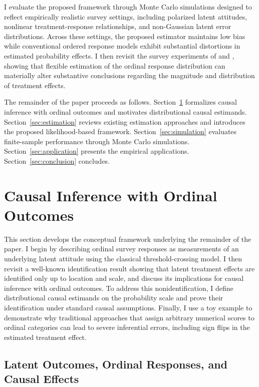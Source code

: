 \documentclass{article}
\begin{document}
I evaluate the proposed framework through Monte Carlo simulations designed to reflect empirically realistic survey settings, including polarized latent attitudes, nonlinear treatment-response relationships, and non-Gaussian latent error distributions. Across these settings, the proposed estimator maintains low bias while conventional ordered response models exhibit substantial distortions in estimated probability effects. I then revisit the survey experiments of \citet{Tomz2020a} and \citet{Mattingly2025a}, showing that flexible estimation of the ordinal response distribution can materially alter substantive conclusions regarding the magnitude and distribution of treatment effects.

The remainder of the paper proceeds as follows. Section~\ref{sec:causalordinal} formalizes causal inference with ordinal outcomes and motivates distributional causal estimands. Section~\ref{sec:estimation} reviews existing estimation approaches and introduces the proposed likelihood-based framework. Section~\ref{sec:simulation} evaluates finite-sample performance through Monte Carlo simulations. Section~\ref{sec:application} presents the empirical applications. Section~\ref{sec:conclusion} concludes.

\clearpage



\section{Causal Inference with Ordinal Outcomes}
\label{sec:causalordinal}

This section develops the conceptual framework underlying the remainder of the paper. I begin by describing ordinal survey responses as measurements of an underlying latent attitude using the classical threshold-crossing model. I then revisit a well-known identification result showing that latent treatment effects are identified only up to location and scale, and discuss its implications for causal inference with ordinal outcomes. To address this nonidentification, I define distributional causal estimands on the probability scale and prove their identification under standard causal assumptions. Finally, I use a toy example to demonstrate why traditional approaches that assign arbitrary numerical scores to ordinal categories can lead to severe inferential errors, including sign flips in the estimated treatment effect.

\subsection{Latent Outcomes, Ordinal Responses, and Causal Effects}
\label{subsec:setup}
\end{document}

